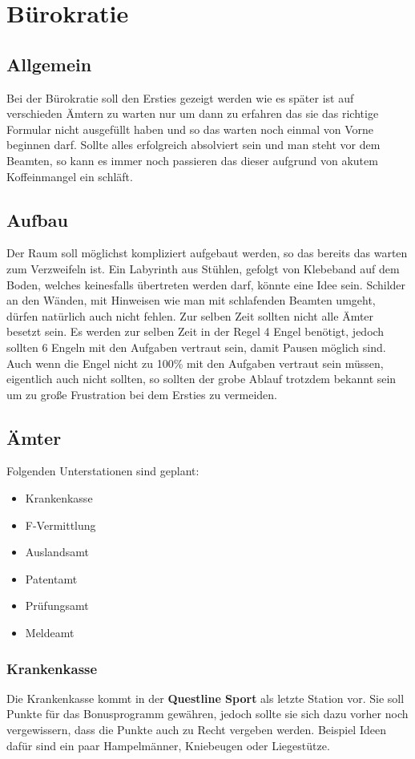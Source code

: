 \section{Bürokratie}

\subsection{Allgemein}
Bei der Bürokratie soll den Ersties gezeigt werden wie es später ist auf verschieden Ämtern zu warten nur um dann zu erfahren das sie das richtige Formular nicht ausgefüllt haben und so das warten noch einmal von Vorne beginnen darf. Sollte alles erfolgreich absolviert sein und man steht vor dem Beamten, so kann es immer noch passieren das dieser aufgrund von akutem Koffeinmangel ein schläft.

\subsection{Aufbau}
Der Raum soll möglichst kompliziert aufgebaut werden, so das bereits das warten zum Verzweifeln ist. Ein Labyrinth aus Stühlen, gefolgt von Klebeband auf dem Boden, welches keinesfalls übertreten werden darf, könnte eine Idee sein. Schilder an den Wänden, mit Hinweisen wie man mit schlafenden Beamten umgeht, dürfen natürlich auch nicht fehlen. Zur selben Zeit sollten nicht alle Ämter besetzt sein. Es werden zur selben Zeit in der Regel 4 Engel benötigt, jedoch sollten 6 Engeln mit den Aufgaben vertraut sein, damit Pausen möglich sind. Auch wenn die Engel nicht zu 100\% mit den Aufgaben vertraut sein müssen, eigentlich auch nicht sollten, so sollten der grobe Ablauf trotzdem bekannt sein um zu große Frustration bei dem Ersties zu vermeiden.

\subsection{Ämter}
Folgenden Unterstationen sind geplant:
\begin{itemize}
    \item Krankenkasse
    \item F-Vermittlung
    \item Auslandsamt
    \item Patentamt
    \item Prüfungsamt
    \item Meldeamt
\end{itemize}
\subsubsection{Krankenkasse}
Die Krankenkasse kommt in der \textbf{Questline Sport} als letzte Station vor. Sie soll Punkte für das Bonusprogramm gewähren, jedoch sollte sie sich dazu vorher noch vergewissern, dass die Punkte auch zu Recht vergeben werden. Beispiel Ideen dafür sind ein paar Hampelmänner, Kniebeugen oder Liegestütze.

